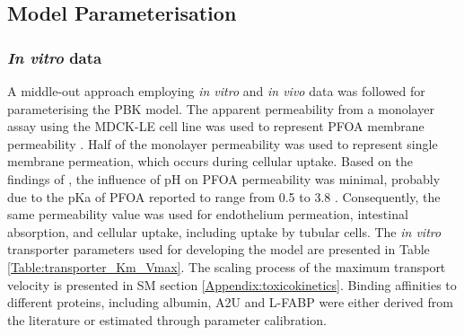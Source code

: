 \documentclass[preprint,12pt,authoryear]{elsarticle}
\begin{document}
\subsection{Model Parameterisation}
\subsubsection{\textit{In vitro} data}
A middle-out approach employing \textit{in vitro} and \textit{in vivo} data was followed for parameterising the PBK model. The apparent permeability from a monolayer assay using the MDCK-LE cell line was used to represent PFOA membrane permeability \citep{rue_2024}. Half of the monolayer permeability was used to represent single membrane permeation, which occurs during cellular uptake. Based on the findings of \citet{ryu_2024}, the influence of pH on PFOA permeability was minimal, probably due to the pKa of PFOA reported to range from 0.5 to 3.8 \citep{burns_2008}. Consequently, the same permeability value was used for endothelium permeation, intestinal absorption, and cellular uptake, including uptake by tubular cells. The \textit{in vitro} transporter parameters used for developing the model are presented in Table \ref{Table:transporter_Km_Vmax}. The scaling process of the maximum transport velocity is presented in SM section \ref{Appendix:toxicokinetics}. Binding affinities to different proteins, including albumin, A2U and L-FABP were either derived from the literature or estimated through parameter calibration.
\end{document}
